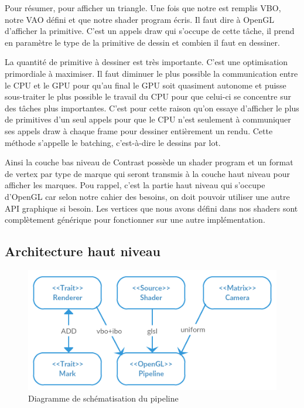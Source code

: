 \documentclass[12pt]{article}
\begin{document}
Pour résumer, pour afficher un triangle. Une fois que notre est remplis VBO, notre VAO défini et que notre shader program écris. Il faut dire à OpenGL d'afficher la primitive.
C'est un appels \og draw \fg{} qui s'occupe de cette tâche, il prend en paramètre le type de la primitive de dessin et combien il faut en dessiner.

La quantité de primitive à dessiner est très importante. C'est une optimisation primordiale à maximiser. Il faut diminuer le plus possible la communication entre le CPU et le GPU pour
qu'au final le GPU soit quasiment autonome et puisse sous-traiter le plus possible le travail du CPU pour que celui-ci se concentre sur des tâches plus importantes.
C'est pour cette raison qu'on essaye d'afficher le plus de primitives d'un seul appels pour que le CPU n'est seulement à communiquer ses appels draw à chaque frame pour dessiner entièrement
un rendu. Cette méthode s'appelle le batching, c'est-à-dire le dessins par lot.

Ainsi la couche bas niveau de Contrast possède un shader program et un format de vertex par type de marque qui seront transmis à la couche haut niveau pour afficher les marques.
Pou rappel, c'est la partie haut niveau qui s'occupe d'OpenGL car selon notre cahier des besoins, on doit pouvoir utiliser une autre API graphique si besoin. Les vertices que nous avons
défini dans nos shaders sont complètement générique pour fonctionner sur une autre implémentation.

\subsection{Architecture haut niveau}


\begin{figure}[htp]
  \centering
  \includegraphics[scale=0.8]{images/pipeline}
  \caption{Diagramme de schématisation du pipeline}
  \label{fig:pipe}
\end{figure}
\end{document}
